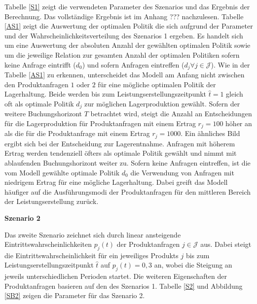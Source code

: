 Tabelle \ref{S1} zeigt die verwendeten Parameter des Szenarios und das Ergebnis der Berechnung. Das vollständige Ergebnis ist im Anhang ??? nachzulesen. Tabelle \ref{AS1} zeigt die Auswertung der optimalen Politik die sich aufgrund der Parameter und der Wahrscheinlichkeitsverteilung des Szenarios 1 ergeben. Es handelt sich um eine Auswertung der absoluten Anzahl der gewählten optimalen Politik sowie um die jeweilige Relation zur gesamten Anzahl der optimalen Politiken sofern keine Anfrage eintrifft ($d_0$) und sofern Anfragen eintreffen ($d_j\forall j \in\mathcal{J}$). Wie in der Tabelle \ref{AS1} zu erkennen, unterscheidet das Modell am Anfang nicht zwischen den Produktanfragen $1$ oder $2$ für eine mögliche optimalen Politik der Lagerhaltung. Beide werden bis zum Leistungserstellungszeitpunkt $\hat t=1$ gleich oft als optimale Politik $d_{j}$ zur möglichen Lagerproduktion gewählt. Sofern der weitere Buchungshorizont $T$ betrachtet wird, steigt die Anzahl an Entscheidungen für die Lagerproduktion für Produktanfragen mit einem Ertrag $r_j=100$ höher an als die für die Produktanfrage mit einem Ertrag $r_j=1000$. Ein ähnliches Bild ergibt sich bei der Entscheidung zur Lagerentnahme. Anfragen mit höherem Ertrag werden tendenziell öfters als optimale Politik gewählt und nimmt mit ablaufenden Buchungshorizont weiter zu. Sofern keine Anfragen eintreffen, ist die vom Modell gewählte optimale Politik $d_{0}$ die Verwendung von Anfragen mit niedrigem Ertrag für eine mögliche Lagerhaltung. Dabei greift das Modell häufiger auf die Ausführungsmodi der Produktanfragen für den mittleren Bereich der Leistungserstellung zurück.

\textbf{Szenario 2}

Das zweite Szenario zeichnet sich durch linear ansteigende Eintrittswahrscheinlichkeiten $p_j(t)$ der Produktanfragen $j\in\mathcal{J}$ aus. Dabei steigt die Eintrittswahrscheinlichkeit für ein jeweiliges Produkts $j$ bis zum Leistungserstellungszeitpunkt $\hat t$ auf $p_j(t)=0,3$ an, wobei die Steigung an jeweils unterschiedlichen Perioden startet. Die weiteren Eigenschaften der Produktanfragen basieren auf den des Szenarios 1. Tabelle \ref{S2} und Abbildung \ref{SB2} zeigen die Parameter für das Szenario 2.

